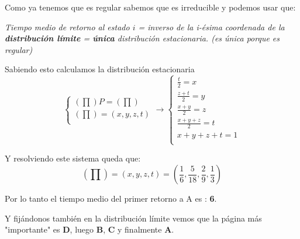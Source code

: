 \begin{problem}[6]
Como ya tenemos que es regular sabemos que es irreducible y podemos usar que:

\textit{Tiempo medio de retorno al estado $i$ = inverso de la i-ésima coordenada de la \textbf{distribución límite} = \textbf{única} distribución estacionaria. (es única porque es regular)}

Sabiendo esto calculamos la distribución estacionaria $$\begin{cases}
(\prod)P = (\prod)\\
(\prod) = (x,y,z,t)\\
\end{cases} \rightarrow \begin{cases}
\frac{t}{2} = x\\
\frac{z+t}{2} = y\\
\frac{x+y}{2} = z\\
\frac{x+y+z}{2} = t\\
x + y + z + t=1\\
\end{cases}$$

Y resolviendo este sistema queda que:
$$(\prod) = (x,y,z,t) = \left(\frac{1}{6}, \frac{5}{18}, \frac{2}{9}, \frac{1}{3}\right)$$

Por lo tanto el tiempo medio del primer retorno a A es : \textbf{6}.

Y fijándonos también en la distribución límite vemos que la página más "importante" es \textbf{D}, luego \textbf{B}, \textbf{C} y finalmente \textbf{A}.




\end{problem}

